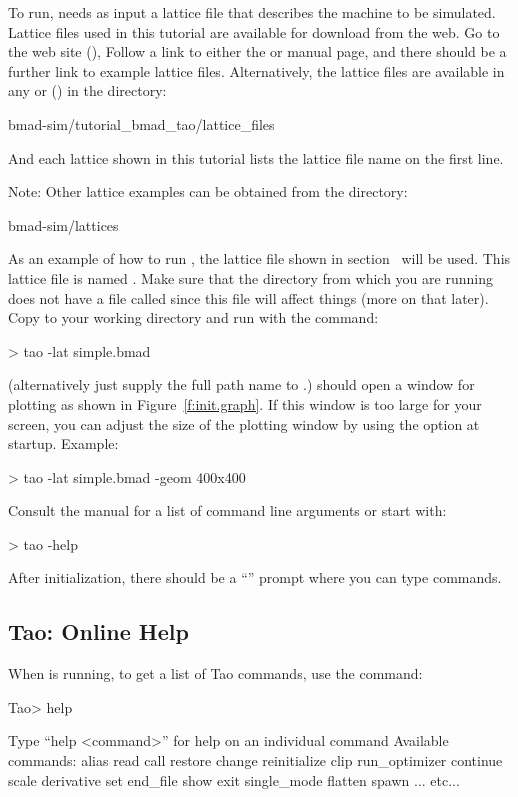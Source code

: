 \documentclass{hitec}     %
\begin{document}
To run, \tao needs as input a \bmad lattice file that describes the machine to be simulated.
Lattice files used in this tutorial are available for download from the web. Go to the \bmad web
site (), Follow a link to either the \bmad or \tao manual page, and there should
be a further link to example lattice files. Alternatively, the lattice files are available in any
 or  () in the directory:
\begin{code}
bmad-sim/tutorial_bmad_tao/lattice_files
\end{code}
And each lattice shown in this tutorial lists the lattice file name on the first line.

Note: Other lattice examples can be obtained from the directory:
\begin{code}
bmad-sim/lattices
\end{code}

As an example of how to run \tao, the lattice file shown in section~ will be
used. This lattice file is named .  Make sure that the directory from which you are
running \tao does not have a file called  since this file will affect things (more on
that later). Copy  to your working directory and run \tao with the command:
\begin{code}
> tao -lat simple.bmad
\end{code}
(alternatively just supply the full path name to .)  \tao should open a window for
plotting as shown in Figure~\ref{f:init.graph}. If this window is too large for your screen, you can
adjust the size of the plotting window by using the  option at startup. Example:
\begin{code}
> tao -lat simple.bmad -geom 400x400
\end{code}
Consult the \tao manual for a list of command line arguments or start \tao with:
\begin{code}
> tao -help
\end{code}

After initialization, there should be a ``'' prompt where you can type \tao commands.

\subsection{Tao: Online Help}

When \tao is running, to get a list of Tao commands, use the  command:
\begin{code}
Tao> help

Type ``help <command>'' for help on an individual command
Available commands:
  alias                             read
  call                              restore
  change                            reinitialize
  clip                              run_optimizer
  continue                          scale
  derivative                        set
  end_file                          show
  exit                              single_mode
  flatten                           spawn
... etc...
\end{code}
\end{document}
